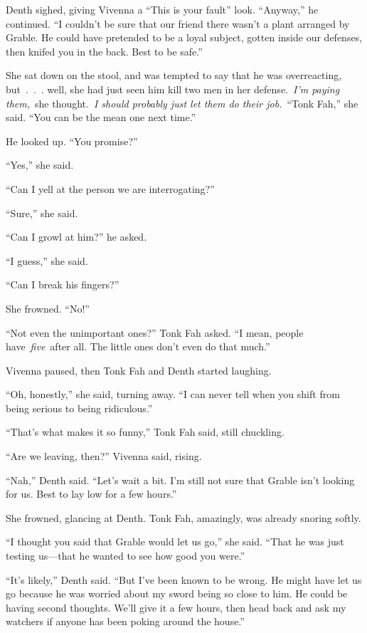 Denth sighed, giving Vivenna a “This is your fault” look. “Anyway,” he continued. “I couldn’t be sure that our friend there wasn’t a plant arranged by Grable. He could have pretended to be a loyal subject, gotten inside our defenses, then knifed you in the back. Best to be safe.”

She sat down on the stool, and was tempted to say that he was overreacting, but~.~.~. well, she had just seen him kill two men in her defense.~\textit{I’m paying them,}~she thought.~\textit{I should probably just let them do their job.}~“Tonk Fah,” she said. “You can be the mean one next time.”

He looked up. “You promise?”

“Yes,” she said.

“Can I yell at the person we are interrogating?”

“Sure,” she said.

“Can I growl at him?” he asked.

“I guess,” she said.

“Can I break his fingers?”

She frowned. “No!”

“Not even the unimportant ones?” Tonk Fah asked. “I mean, people have~\textit{five}~after all. The little ones don’t even do that much.”

Vivenna paused, then Tonk Fah and Denth started laughing.

“Oh, honestly,” she said, turning away. “I can never tell when you shift from being serious to being ridiculous.”

“That’s what makes it so funny,” Tonk Fah said, still chuckling.

“Are we leaving, then?” Vivenna said, rising.

“Nah,” Denth said. “Let’s wait a bit. I’m still not sure that Grable isn’t looking for us. Best to lay low for a few hours.”

She frowned, glancing at Denth. Tonk Fah, amazingly, was already snoring softly.

“I thought you said that Grable would let us go,” she said. “That he was just testing us—that he wanted to see how good you were.”

“It’s likely,” Denth said. “But I’ve been known to be wrong. He might have let us go because he was worried about my sword being so close to him. He could be having second thoughts. We’ll give it a few hours, then head back and ask my watchers if anyone has been poking around the house.”

